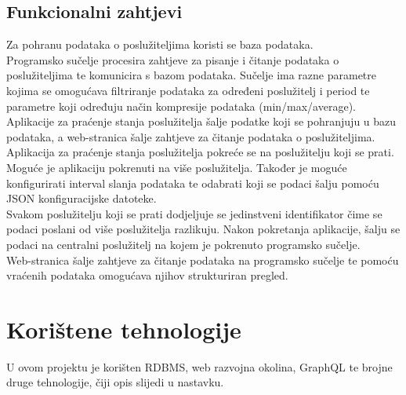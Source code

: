 \documentclass[zavrsnirad]{fer}
\begin{document}
\section{Funkcionalni zahtjevi}
Za pohranu podataka o poslužiteljima koristi se baza podataka.
\\Programsko sučelje procesira zahtjeve za pisanje i čitanje podataka o poslužiteljima te komunicira s bazom podataka. Sučelje ima razne parametre kojima se omogućava filtriranje podataka za određeni poslužitelj i period te parametre koji određuju način kompresije podataka (min/max/average). Aplikacije za praćenje stanja poslužitelja šalje podatke koji se pohranjuju  u bazu podataka, a web-stranica šalje zahtjeve za čitanje podataka o poslužiteljima.
\\Aplikacija za praćenje stanja poslužitelja pokreće se na poslužitelju koji se prati. Moguće je aplikaciju pokrenuti na više poslužitelja. Također je moguće konfigurirati interval slanja podataka te odabrati koji se podaci šalju pomoću JSON konfiguracijske datoteke.
\\Svakom poslužitelju koji se prati dodjeljuje se jedinstveni identifikator čime se podaci poslani od više poslužitelja razlikuju. Nakon pokretanja aplikacije, šalju se podaci na centralni poslužitelj na kojem je pokrenuto programsko sučelje.
\\Web-stranica šalje zahtjeve za čitanje podataka na programsko sučelje te pomoću vraćenih podataka omogućava njihov strukturiran pregled.

\chapter{Korištene tehnologije}
\label{pog:koristene_tehnologije}
U ovom projektu je korišten RDBMS, web razvojna okolina, GraphQL te brojne druge tehnologije, čiji opis slijedi u nastavku.
\end{document}
